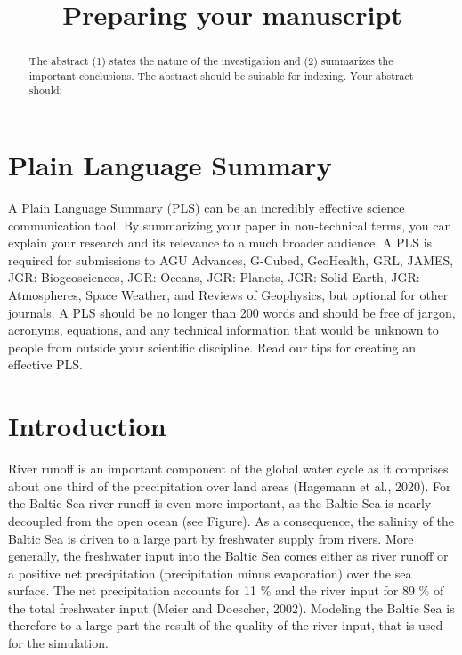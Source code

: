 \documentclass[
]{agujournal2019}
\begin{document}
\title{Preparing your manuscript}



\begin{abstract}
The abstract (1) states the nature of the investigation and (2)
summarizes the important conclusions. The abstract should be suitable
for indexing. Your abstract should:
\end{abstract}

\section*{Plain Language Summary}
A Plain Language Summary (PLS) can be an incredibly effective science
communication tool. By summarizing your paper in non-technical terms,
you can explain your research and its relevance to a much broader
audience. A PLS is required for submissions to AGU Advances, G-Cubed,
GeoHealth, GRL, JAMES, JGR: Biogeosciences, JGR: Oceans, JGR: Planets,
JGR: Solid Earth, JGR: Atmospheres, Space Weather, and Reviews of
Geophysics, but optional for other journals. A PLS should be no longer
than 200 words and should be free of jargon, acronyms, equations, and
any technical information that would be unknown to people from outside
your scientific discipline. Read our tips for creating an effective PLS.


\ifdefined\Shaded\renewenvironment{Shaded}{\begin{tcolorbox}[enhanced, sharp corners, interior hidden, boxrule=0pt, borderline west={3pt}{0pt}{shadecolor}, frame hidden, breakable]}{\end{tcolorbox}}\fi

\hypertarget{introduction}{%
\section{Introduction}\label{introduction}}

River runoff is an important component of the global water cycle as it
comprises about one third of the precipitation over land areas (Hagemann
et al., 2020). For the Baltic Sea river runoff is even more important,
as the Baltic Sea is nearly decoupled from the open ocean (see Figure).
As a consequence, the salinity of the Baltic Sea is driven to a large
part by freshwater supply from rivers. More generally, the freshwater
input into the Baltic Sea comes either as river runoff or a positive net
precipitation (precipitation minus evaporation) over the sea surface.
The net precipitation accounts for 11 \% and the river input for 89 \%
of the total freshwater input (Meier and Doescher, 2002). Modeling the
Baltic Sea is therefore to a large part the result of the quality of the
river input, that is used for the simulation.
\end{document}
